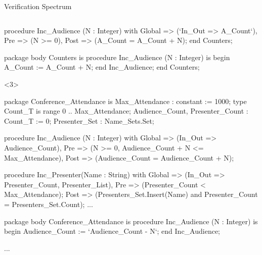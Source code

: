 \documentclass{beamer}
\begin{document}
\begin{frame}[fragile]{Verification Spectrum}
\begin{columns}
\begin{column}{9cm}
\begin{onlyenv}
\begin{pxcode}[language=SPARK,style=magic,gobble=8]
           procedure Inc_Audience (N : Integer)
           with Global => (`In_Out => A_Count`),
                Pre    => (N >= 0),
                Post   => (A_Count = A_Count + N);
        end Counters;

        package body Counters
        is
           procedure Inc_Audience (N : Integer)
           is
           begin
              A_Count := A_Count + N;
           end Inc_Audience;
        end Counters;
      \end{pxcode}
      \end{onlyenv}

      \begin{onlyenv}<3>
      \begin{pxcode}[language=SPARK,style=magic,gobble=8]
        package Conference_Attendance
        is
           Max_Attendance : constant := 1000;
           type Count_T is range 0 .. Max_Attendance;
           Audience_Count, Presenter_Count : Count_T := 0;
           Presenter_Set : Name_Sets.Set;

           procedure Inc_Audience (N : Integer)
           with Global => (In_Out => Audience_Count),
                Pre    => (N >= 0, Audience_Count + N <= Max_Attendance),
                Post   => (Audience_Count = Audience_Count + N);

           procedure Inc_Presenter(Name : String)
           with Global => (In_Out => Presenter_Count, Presenter_List),
                Pre    => (Presenter_Count < Max_Attendance);
                Post   => (Presenters_Set.Insert(Name) and 
                           Presenter_Count = Presenters_Set.Count);
           ...


        package body Conference_Attendance
        is
           procedure Inc_Audience (N : Integer)
           is
           begin
              Audience_Count := `Audience_Count - N`;
           end Inc_Audience;

           ...
      \end{pxcode}
      \end{onlyenv}

    \end{column}
  \end{columns}

\end{frame}
\end{document}
